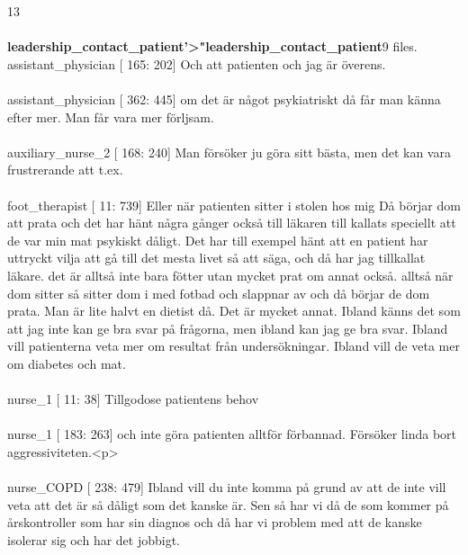 \documentclass[12pt,a4paper,oneside]{article}
\begin{document}
13 \\\ \\{\bf leadership\_contact\_patient'>"leadership\_contact\_patient}9 files.
 assistant\_physician [ 165: 202] 
Och att patienten och jag {\"a}r {\"o}verens. %
\\\ \\
 assistant\_physician [ 362: 445] 
om det {\"a}r n{\aa}got psykiatriskt d{\aa} f{\aa}r man k{\"a}nna efter mer. Man f{\aa}r vara mer f{\"o}rljsam. %
\\\ \\
 auxiliary\_nurse\_2 [ 168: 240] 
Man f{\"o}rs{\"o}ker ju g{\"o}ra sitt b{\"a}sta, men det kan vara frustrerande att t.ex. %
\\\ \\
 foot\_therapist [  11: 739] 
Eller n{\"a}r patienten sitter i stolen hos mig D{\aa} b{\"o}rjar dom att prata och det har h{\"a}nt n{\aa}gra g{\aa}nger ocks{\aa} till l{\"a}karen till kallats speciellt att de var min mat psykiskt d{\aa}ligt. Det har till exempel h{\"a}nt att en patient har uttryckt vilja att g{\aa} till det mesta livet s{\aa} att s{\"a}ga, och d{\aa} har jag tillkallat l{\"a}kare. det {\"a}r allts{\aa} inte bara f{\"o}tter utan mycket prat om annat ocks{\aa}. allts{\aa} n{\"a}r dom sitter s{\aa} sitter dom i med fotbad och slappnar av och d{\aa} b{\"o}rjar de dom prata. Man {\"a}r lite halvt en dietist d{\aa}. Det {\"a}r mycket annat. Ibland k{\"a}nns det som att jag inte kan ge bra svar p{\aa} fr{\aa}gorna, men ibland kan jag ge bra svar. Ibland vill patienterna veta mer om resultat fr{\aa}n unders{\"o}kningar. Ibland vill de veta mer om diabetes och mat.  %
\\\ \\
 nurse\_1 [  11:  38] 
Tillgodose patientens behov %
\\\ \\
 nurse\_1 [ 183: 263] 
och inte g{\"o}ra patienten alltf{\"o}r f{\"o}rbannad. F{\"o}rs{\"o}ker linda bort aggressiviteten.<p> %
\\\ \\
 nurse\_COPD [ 238: 479] 
Ibland vill du inte komma p{\aa} grund av att de inte vill veta att det {\"a}r s{\aa} d{\aa}ligt som det kanske {\"a}r. Sen s{\aa} har vi d{\aa} de som kommer p{\aa} {\aa}rskontroller som har sin diagnos och d{\aa} har vi problem med att de kanske isolerar sig och har det jobbigt. %
\end{document}
